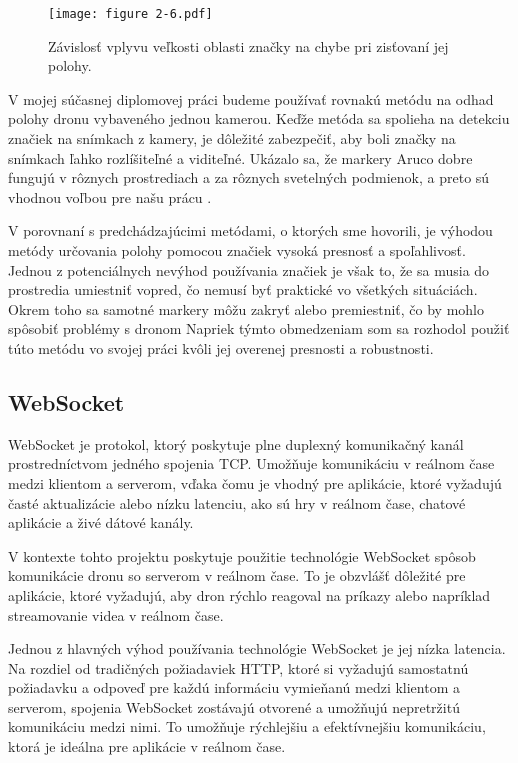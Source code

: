 \begin{figure}[ht!]
    \centering
    \texttt{[image: figure 2-6.pdf]} 
    \caption{Závislosť vplyvu veľkosti oblasti značky na chybe pri zisťovaní jej polohy.}
    \label{o:2-6}
\end{figure}

V mojej súčasnej diplomovej práci budeme používať rovnakú metódu na odhad polohy dronu vybaveného jednou kamerou. Keďže metóda sa spolieha na detekciu značiek na snímkach z kamery, je dôležité zabezpečiť, aby boli značky na snímkach ľahko rozlíšiteľné a viditeľné. Ukázalo sa, že markery Aruco dobre fungujú v rôznych prostrediach a za rôznych svetelných podmienok, a preto sú vhodnou voľbou pre našu prácu \citep{Cheng2017}.

\newpage
V porovnaní s predchádzajúcimi metódami, o ktorých sme hovorili, je výhodou metódy určovania polohy pomocou značiek vysoká presnosť a spoľahlivosť. Jednou z potenciálnych nevýhod používania značiek je však to, že sa musia do prostredia umiestniť vopred, čo nemusí byť praktické vo všetkých situáciách. Okrem toho sa samotné markery môžu zakryť alebo premiestniť, čo by mohlo spôsobiť problémy s dronom Napriek týmto obmedzeniam som sa rozhodol použiť túto metódu vo svojej práci kvôli jej overenej presnosti a robustnosti.

\subsection{WebSocket}
WebSocket je protokol, ktorý poskytuje plne duplexný komunikačný kanál prostredníctvom jedného spojenia TCP. Umožňuje komunikáciu v reálnom čase medzi klientom a serverom, vďaka čomu je vhodný pre aplikácie, ktoré vyžadujú časté aktualizácie alebo nízku latenciu, ako sú hry v reálnom čase, chatové aplikácie a živé dátové kanály.

V kontexte tohto projektu poskytuje použitie technológie WebSocket spôsob komunikácie dronu so serverom v reálnom čase. To je obzvlášť dôležité pre aplikácie, ktoré vyžadujú, aby dron rýchlo reagoval na príkazy alebo napríklad streamovanie videa v reálnom čase.

Jednou z hlavných výhod používania technológie WebSocket je jej nízka latencia. Na rozdiel od tradičných požiadaviek HTTP, ktoré si vyžadujú samostatnú požiadavku a odpoveď pre každú informáciu vymieňanú medzi klientom a serverom, spojenia WebSocket zostávajú otvorené a umožňujú nepretržitú komunikáciu medzi nimi. To umožňuje rýchlejšiu a efektívnejšiu komunikáciu, ktorá je ideálna pre aplikácie v reálnom čase.

